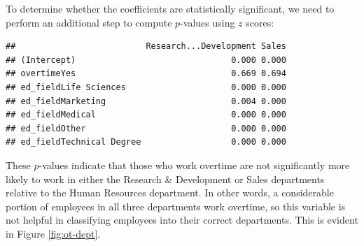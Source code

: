 \documentclass[
]{book}
\newenvironment{Shaded}{\begin{snugshade}}{\end{snugshade}}
\newcommand{\CommentTok}[1]{\textcolor[rgb]{0.56,0.35,0.01}{\textit{#1}}}
\newcommand{\DecValTok}[1]{\textcolor[rgb]{0.00,0.00,0.81}{#1}}
\newcommand{\FunctionTok}[1]{\textcolor[rgb]{0.00,0.00,0.00}{#1}}
\newcommand{\NormalTok}[1]{#1}
\newcommand{\OtherTok}[1]{\textcolor[rgb]{0.56,0.35,0.01}{#1}}
\newcommand{\SpecialCharTok}[1]{\textcolor[rgb]{0.00,0.00,0.00}{#1}}
\begin{document}
To determine whether the coefficients are statistically significant, we need to perform an additional step to compute \(p\)-values using \(z\) scores:

\begin{Shaded}
\end{Shaded}

\begin{verbatim}
##                          Research...Development Sales
## (Intercept)                               0.000 0.000
## overtimeYes                               0.669 0.694
## ed_fieldLife Sciences                     0.000 0.000
## ed_fieldMarketing                         0.004 0.000
## ed_fieldMedical                           0.000 0.000
## ed_fieldOther                             0.000 0.000
## ed_fieldTechnical Degree                  0.000 0.000
\end{verbatim}

These \(p\)-values indicate that those who work overtime are not significantly more likely to work in either the Research \& Development or Sales departments relative to the Human Resources department. In other words, a considerable portion of employees in all three departments work overtime, so this variable is not helpful in classifying employees into their correct departments. This is evident in Figure \ref{fig:ot-dept}.
\end{document}
